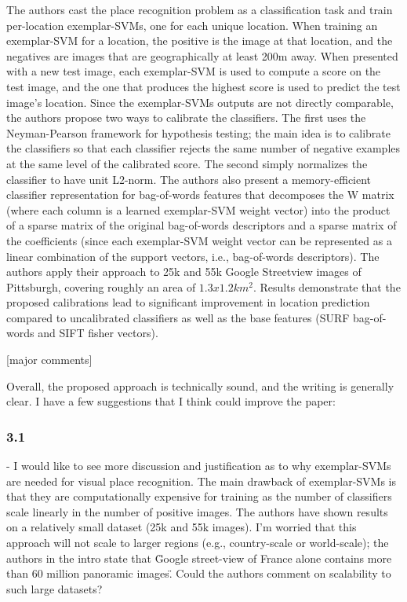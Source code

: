 \documentclass[a4paper,12pt]{article}
\begin{document}
The authors cast the place recognition problem as a classification task and train per-location exemplar-SVMs, one for each unique location. When training an exemplar-SVM for a location, the positive is the image at that location, and the negatives are images that are geographically at least 200m away. When presented with a new test image, each exemplar-SVM is used to compute a score on the test image, and the one that produces the highest score is used to predict the test image's location. Since the exemplar-SVMs outputs are not directly comparable, the authors propose two ways to calibrate the classifiers. The first uses the Neyman-Pearson framework for hypothesis testing; the main idea is to calibrate the classifiers so that each classifier rejects the same number of negative examples at the same level of the calibrated score. The second simply normalizes the classifier to have unit L2-norm. The authors also present a memory-efficient classifier representation for bag-of-words features that decomposes the W matrix (where each column is a learned exemplar-SVM weight vector) into the product of a sparse matrix of the original bag-of-words descriptors and a sparse matrix of the coefficients (since each exemplar-SVM weight vector can be represented as a linear combination of the support vectors, i.e., bag-of-words descriptors). The authors apply their approach to 25k and 55k Google Streetview images of Pittsburgh, covering roughly an area of $1.3x1.2 km^2$. Results demonstrate that the proposed calibrations lead to significant improvement in location prediction compared to uncalibrated classifiers as well as the base features (SURF bag-of-words and SIFT fisher vectors).

[major comments]

Overall, the proposed approach is technically sound, and the writing is generally clear. I have a few suggestions that I think could improve the paper:

\subsubsection*{3.1}
- I would like to see more discussion and justification as to why exemplar-SVMs are needed for visual place recognition. The main drawback of exemplar-SVMs is that they are computationally expensive for training as the number of classifiers scale linearly in the number of positive images. The authors have shown results on a relatively small dataset (25k and 55k images). I'm worried that this approach will not scale to larger regions (e.g., country-scale or world-scale); the authors in the intro state that \"Google street-view of France alone contains more than 60 million panoramic images\".
Could the authors comment on scalability to such large datasets?
\end{document}
